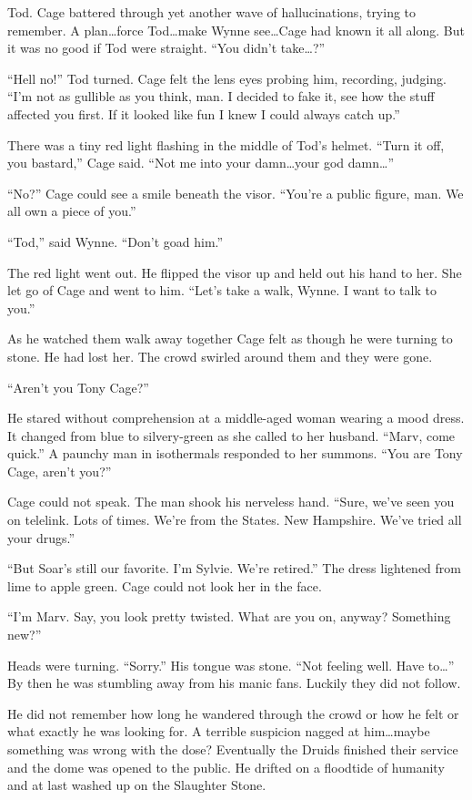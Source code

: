 Tod. Cage battered through yet another wave of hallucinations, trying to remember. A plan\ldots force Tod\ldots make Wynne see\ldots Cage had known it all along. But it was no good if Tod were straight. ``You didn't take\ldots?''

``Hell no!'' Tod turned. Cage felt the lens eyes probing him, recording, judging. ``I'm not as gullible as you think, man. I decided to fake it, see how the stuff affected you first. If it looked like fun I knew I could always catch up.''

There was a tiny red light flashing in the middle of Tod's helmet. ``Turn it off, you bastard,'' Cage said. ``Not me into your damn\ldots your god damn\ldots''

``No?'' Cage could see a smile beneath the visor. ``You're a public figure, man. We all own a piece of you.''

``Tod,'' said Wynne. ``Don't goad him.''

The red light went out. He flipped the visor up and held out his hand to her. She let go of Cage and went to him. ``Let's take a walk, Wynne. I want to talk to you.''

As he watched them walk away together Cage felt as though he were turning to stone. He had lost her. The crowd swirled around them and they were gone.

``Aren't you Tony Cage?''

He stared without comprehension at a middle-aged woman wearing a mood dress. It changed from blue to silvery-green as she called to her husband. ``Marv, come quick.'' A paunchy man in isothermals responded to her summons. ``You are Tony Cage, aren't you?''

Cage could not speak. The man shook his nerveless hand. ``Sure, we've seen you on telelink. Lots of times. We're from the States. New Hampshire. We've tried all your drugs.''

``But Soar's still our favorite. I'm Sylvie. We're retired.'' The dress lightened from lime to apple green. Cage could not look her in the face.

``I'm Marv. Say, you look pretty twisted. What are you on, anyway? Something new?''

Heads were turning. ``Sorry.'' His tongue was stone. ``Not feeling well. Have to\ldots'' By then he was stumbling away from his manic fans. Luckily they did not follow.

He did not remember how long he wandered through the crowd or how he felt or what exactly he was looking for. A terrible suspicion nagged at him\ldots maybe something was wrong with the dose? Eventually the Druids finished their service and the dome was opened to the public. He drifted on a floodtide of humanity and at last washed up on the Slaughter Stone.


